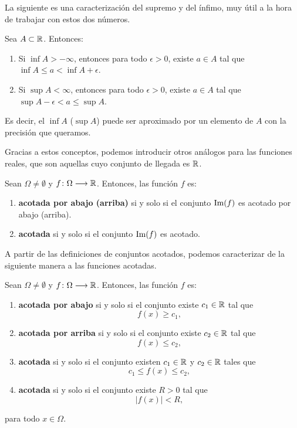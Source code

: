 La siguiente es una caracterización del supremo y del ínfimo, muy útil a la hora de trabajar con
estos dos números.

\begin{teocal}\label{teo:daCaracterizacionSupInf}
Sea $A\subset\mathbb{R}$. Entonces:
\begin{enumerate}
\item Si $\inf A > -\infty$, entonces para todo $\epsilon > 0$, existe $a \in A$ tal que $\inf
    A \leq a < \inf A + \epsilon$.
\item Si $\sup A < \infty$, entonces para todo $\epsilon > 0$, existe $a \in A$ tal que $\sup A
    - \epsilon < a \leq \sup A$.
\end{enumerate}
\end{teocal}

Es decir, el $\inf A$ ($\sup A$) puede ser aproximado por un elemento de $A$ con la precisión que
queramos.

Gracias a estos conceptos, podemos introducir otros análogos para las funciones reales, que son
aquellas cuyo conjunto de llegada es $\mathbb{R}$.

\begin{defical}
Sean $\Omega\neq\emptyset$ y $f\colon \Omega\longrightarrow \mathbb{R}$. Entonces, las función $f$ es:
\begin{enumerate}
\item \textbf{acotada por abajo (arriba)} si y solo si el conjunto $\operatorname{Im}(f)$ es acotado por
    abajo (arriba).
\item \textbf{acotada} si y solo si el conjunto $\operatorname{Im}(f)$ es acotado.
\end{enumerate}
\end{defical}

A partir de las definiciones de conjuntos acotados, podemos caracterizar de la siguiente manera a
las funciones acotadas.

\begin{teocal}\label{teo:daCaracterizacionFuncAcotadas}
Sean $\Omega\neq\emptyset$ y $f\colon \Omega\longrightarrow \mathbb{R}$. Entonces, las función $f$ es:
\begin{enumerate}
\item \textbf{acotada por abajo} si y solo si el conjunto existe $c_1\in\mathbb{R}$ tal que
    \[
      f(x) \geq c_1,
    \]
\item \textbf{acotada por arriba} si y solo si el conjunto existe $c_2\in\mathbb{R}$ tal que
    \[
      f(x) \leq c_2,
    \]
\item \textbf{acotada} si y solo si el conjunto existen $c_1\in\mathbb{R}$ y $c_2\in\mathbb{R}$ tales que
    \[
      c_1 \leq f(x) \leq c_2,
    \]
\item \textbf{acotada} si y solo si el conjunto existe $R > 0$ tal que
    \[
      |f(x)| < R,
    \]
\end{enumerate}
para todo $x\in\Omega$.
\end{teocal}

